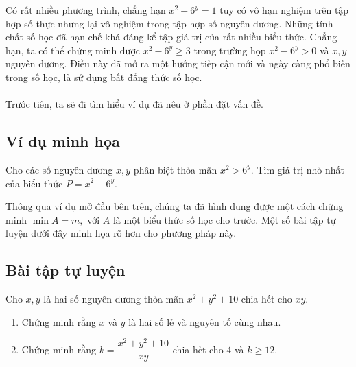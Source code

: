 Có rất nhiều phương trình, chẳng hạn $x^2-6^y=1$ tuy có vô hạn nghiệm trên tập hợp số thực nhưng lại vô nghiệm trong tập hợp số nguyên dương. Những tính chất số học đã hạn chế khá đáng kể tập giá trị của rất nhiều biểu thức. Chẳng hạn, ta có thể chứng minh được $x^2-6^y\ge3$ trong trường họp $x^2-6^y>0$ và $x,y$ nguyên dương. Điều này đã mở ra một hướng tiếp cận mới và ngày càng phổ biến trong số học, là sử dụng bất đẳng thức số học.
\\ \\
Trước tiên, ta sẽ đi tìm hiểu ví dụ đã nêu ở phần đặt vấn đề.
\subsection*{Ví dụ minh họa}

\begin{bx}
Cho các số nguyên dương $x,y$ phân biệt thỏa mãn $x^2>6^y.$ Tìm giá trị nhỏ nhất của biểu thức $P=x^2-6^y.$
\begin{luuy}
Thông qua ví dụ mở đầu bên trên, chúng ta đã hình dung được một cách chứng minh $\min A=m,$ với $A$ là một biểu thức số học cho trước. Một số bài tập tự luyện dưới đây minh họa rõ hơn cho phương pháp này.
\end{luuy}
\end{bx}


\subsection*{Bài tập tự luyện}

\begin{btt}
Cho $x,y$ là hai số nguyên dương thỏa mãn ${{x}^{2}}+{{y}^{2}}+10$ chia hết cho $xy.$
\begin{enumerate}[a,]
 \item Chứng minh rằng $x$ và $y$ là hai số lẻ và nguyên tố cùng nhau.
   \item Chứng minh rằng $k=\dfrac{{{x}^{2}}+{{y}^{2}}+10}{xy}$ chia hết cho $4$ và $k\ge 12.$
\end{enumerate}
\end{btt}

